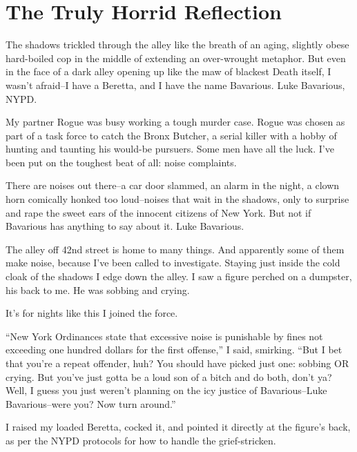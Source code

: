 \chapter{The Truly Horrid Reflection}





The shadows trickled through the alley like the breath of an aging,
slightly obese hard-boiled cop in the middle of extending an
over-wrought metaphor. But even in the face of a dark alley opening
up like the maw of blackest Death itself, I wasn't afraid--I
have a Beretta, and I have the name Bavarious. Luke Bavarious,
NYPD.



My partner Rogue was busy working a tough murder case. Rogue was
chosen as part of a task force to catch the Bronx Butcher, a serial
killer with a hobby of hunting and taunting his would-be pursuers.
Some men have all the luck. I've been put on the toughest
beat of all: noise complaints.



There are noises out there--a car door slammed, an alarm in the
night, a clown horn comically honked too loud--noises that wait in
the shadows, only to surprise and rape the sweet ears of the
innocent citizens of New York. But not if Bavarious has anything to
say about it. Luke Bavarious.



The alley off 42nd street is home to many things. And apparently
some of them make noise, because I've been called to
investigate. Staying just inside the cold cloak of the shadows I
edge down the alley. I saw a figure perched on a dumpster, his back
to me. He was sobbing and crying.



It's for nights like this I joined the force.



``New York Ordinances state that excessive noise is punishable
by fines not exceeding one hundred dollars for the first
offense,'' I said, smirking. ``But I bet that
you're a repeat offender, huh? You should have picked just
one: sobbing OR crying. But you've just gotta be a loud son
of a bitch and do both, don't ya? Well, I guess you just
weren't planning on the icy justice of Bavarious--Luke
Bavarious--were you? Now turn around.''



I raised my loaded Beretta, cocked it, and pointed it directly at
the figure's back, as per the NYPD protocols for how to
handle the grief-stricken.



